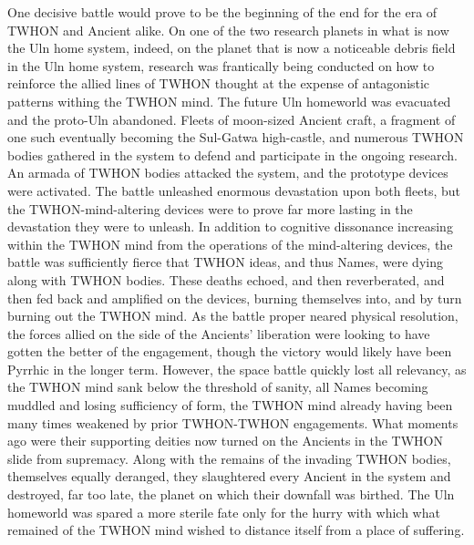 One decisive battle would prove to be the beginning of the end for the
era of TWHON and Ancient alike. On one of the two research planets in
what is now the Uln home system, indeed, on the planet that is now a
noticeable debris field in the Uln home system, research was
frantically being conducted on how to reinforce the allied lines of
TWHON thought at the expense of antagonistic patterns withing the
TWHON mind. The future Uln homeworld was evacuated and the proto-Uln
abandoned. Fleets of moon-sized Ancient craft, a fragment of one such
eventually becoming the Sul-Gatwa high-castle, and numerous TWHON
bodies gathered in the system to defend and participate in the ongoing
research. An armada of TWHON bodies attacked the system, and the
prototype devices were activated. The battle unleashed enormous
devastation upon both fleets, but the TWHON-mind-altering devices were
to prove far more lasting in the devastation they were to unleash. In
addition to cognitive dissonance increasing within the TWHON mind from
the operations of the mind-altering devices, the battle was
sufficiently fierce that TWHON ideas, and thus Names, were dying along
with TWHON bodies. These deaths echoed, and then reverberated, and
then fed back and amplified on the devices, burning themselves into,
and by turn burning out the TWHON mind. As the battle proper neared
physical resolution, the forces allied on the side of the Ancients'
liberation were looking to have gotten the better of the engagement,
though the victory would likely have been Pyrrhic in the longer
term. However, the space battle quickly lost all relevancy, as the
TWHON mind sank below the threshold of sanity, all Names becoming
muddled and losing sufficiency of form, the TWHON mind already having
been many times weakened by prior TWHON-TWHON engagements. What
moments ago were their supporting deities now turned on the Ancients
in the TWHON slide from supremacy. Along with the remains of the
invading TWHON bodies, themselves equally deranged, they slaughtered
every Ancient in the system and destroyed, far too late, the planet on
which their downfall was birthed. The Uln homeworld was spared a more
sterile fate only for the hurry with which what remained of the TWHON
mind wished to distance itself from a place of suffering.


